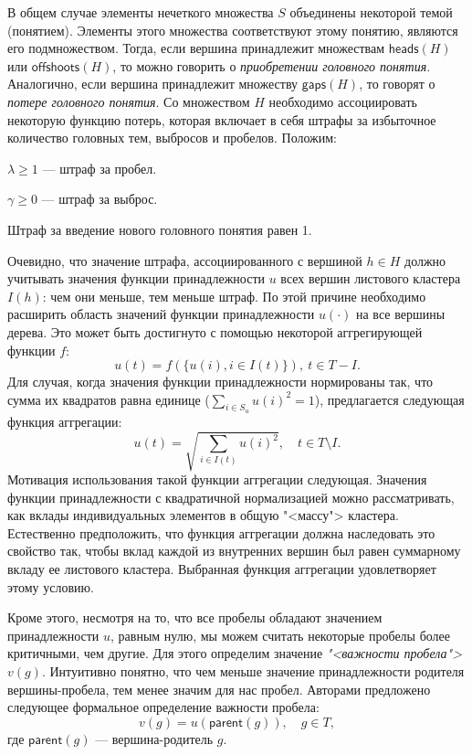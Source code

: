 \documentclass[12pt]{article}
\newenvironment{itemize*}%
{\begin{itemize}%
	\setlength{\itemsep}{0pt}%
	\setlength{\parskip}{0pt}}%
{\end{itemize}}
\begin{document}
В общем случае элементы нечеткого множества $S$ объединены некоторой темой (понятием). Элементы этого множества соответствуют этому понятию, являются его подмножеством. Тогда, если вершина принадлежит множествам $\textsf{heads}(H)$ или $\textsf{offshoots}(H)$, то можно говорить о \textit{приобретении головного понятия}. Аналогично, если вершина принадлежит множеству $\textsf{gaps}(H)$, то говорят о \textit{потере головного понятия}. Со множеством $H$ необходимо ассоциировать некоторую функцию потерь, которая включает в себя штрафы за избыточное количество головных тем, выбросов и пробелов. Положим:

\begin{itemize*}
	\item $\lambda\geq1$ --- штраф за пробел.
	\item $\gamma\geq0$ --- штраф за выброс.
	\item Штраф за введение нового головного понятия равен 1.
\end{itemize*} 

Очевидно, что значение штрафа, ассоциированного с вершиной $h\in H$ должно учитывать значения функции принадлежности $u$ всех вершин листового кластера $I(h)$: чем они меньше, тем меньше штраф. По этой причине необходимо расширить область значений функции принадлежности $u(\cdot)$ на все вершины дерева. Это может быть достигнуто с помощью некоторой аггрегирующей функции $f$:
\begin{equation}
	u(t) = f(\{u(i),i\in I(t)\}), \ t\in T-I.
\end{equation}
Для случая, когда значения функции принадлежности нормированы так, что сумма их квадратов равна единице ($\sum_{i\in S_u}u(i)^2=1$), предлагается следующая функция аггрегации:
\begin{equation}
	u(t) = \sqrt{\sum_{i\in I(t)}u(i)^2}, \quad  t\in T\setminus I.
	\label{eq:u_extend}
\end{equation} %
Мотивация использования такой функции аггрегации следующая. Значения функции принадлежности с квадратичной нормализацией можно рассматривать, как вклады индивидуальных элементов в общую "<массу"> кластера. Естественно предположить, что функция аггрегации должна наследовать это свойство так, чтобы вклад каждой из внутренних вершин был равен суммарному вкладу ее листового кластера. Выбранная функция аггрегации удовлетворяет этому условию.

Кроме этого, несмотря на то, что все пробелы обладают значением принадлежности $u$, равным нулю, мы можем считать некоторые пробелы более критичными, чем другие. Для этого определим значение \textit{"<важности пробела">} $v(g)$. Интуитивно понятно, что чем меньше значение принадлежности родителя вершины-пробела, тем менее значим для нас пробел. Авторами \cite{mirkin2018preprint} предложено следующее формальное определение важности пробела:
\begin{equation}
	v(g)=u(\textsf{parent}(g)), \quad g\in T,
	\label{eq:gap_importance}
\end{equation}
где $\textsf{parent}(g)$ --- вершина-родитель $g$.
\end{document}
